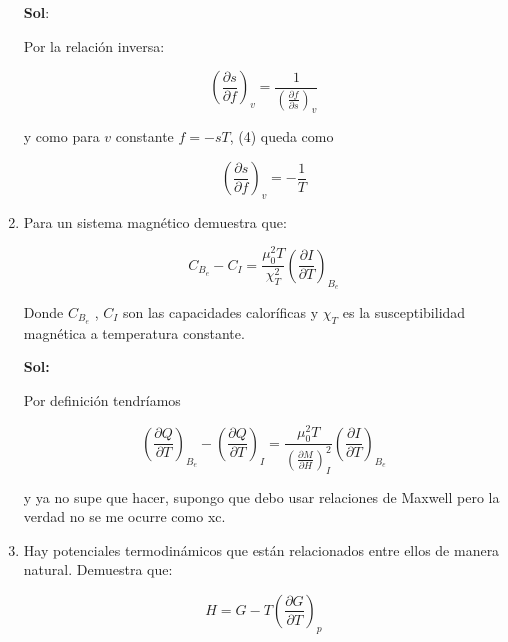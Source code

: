 \documentclass[12pt,a4paper]{article}
\begin{document}
\begin{enumerate}
\textbf{Sol}:

Por la relación inversa:

\begin{equation}
    \left(\frac{\partial s}{ \partial f}\right)_{v} = \frac{1}{\left(\frac{\partial f}{ \partial s}\right)_{v}}
\end{equation}

y como para $v$ constante $f = -sT$, (4) queda como

\begin{equation}
    \left(\frac{\partial s}{ \partial f}\right)_{v} = - \frac{1}{T}
\end{equation}










\item Para un sistema magnético demuestra que:

\begin{equation*}
    C_{B_{e}} - C_{I} = \frac{\mu_{0}^{2}T}{\chi_{T}^{2}} \left(\frac{\partial I}{\partial T}\right)_{B_{e}}
\end{equation*}

Donde $C_{B_{e}}$ , $C_{I}$ son las capacidades caloríficas y $\chi_{T}$ es la susceptibilidad magnética a temperatura constante.

\textbf{Sol:}

Por definición tendríamos

\begin{equation}
    \left(\frac{\partial Q}{\partial T}\right)_{B_{e}} - \left(\frac{\partial Q}{\partial T}\right)_{I} = \frac{\mu_{0}^{2}T}{\left(\frac{\partial M}{\partial H}\right)_{I}^{2}} \left(\frac{\partial I}{\partial T}\right)_{B_{e}}
\end{equation}

y ya no supe que hacer, supongo que debo usar relaciones de Maxwell pero la verdad no se me ocurre como xc.






\item Hay potenciales termodinámicos que están relacionados entre ellos de manera natural. Demuestra que:

\begin{equation*}
    H = G - T \left(\frac{\partial G}{\partial T}\right)_{p}
\end{equation*}


\end{enumerate}
\end{document}
